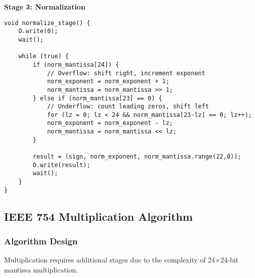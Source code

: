 \textbf{Stage 3: Normalization}
\begin{lstlisting}[caption=Normalization Stage]
void normalize_stage() {
    O.write(0);
    wait();
    
    while (true) {
        if (norm_mantissa[24]) {
            // Overflow: shift right, increment exponent
            norm_exponent = norm_exponent + 1;
            norm_mantissa = norm_mantissa >> 1;
        } else if (norm_mantissa[23] == 0) {
            // Underflow: count leading zeros, shift left
            for (lz = 0; lz < 24 && norm_mantissa[23-lz] == 0; lz++);
            norm_exponent = norm_exponent - lz;
            norm_mantissa = norm_mantissa << lz;
        }
        
        result = (sign, norm_exponent, norm_mantissa.range(22,0));
        O.write(result);
        wait();
    }
}
\end{lstlisting}

\subsection{IEEE 754 Multiplication Algorithm}
\label{subsec:ieee754_multiplication}

\subsubsection{Algorithm Design}

Multiplication requires additional stages due to the complexity of 24×24-bit mantissa multiplication.

